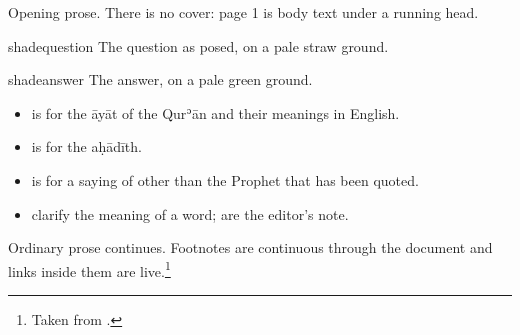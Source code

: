 \documentclass[12pt]{article}
\begin{document}


Opening prose. There is no cover: page 1 is body text under a running
head.

\begin{shaded}{shadequestion}
The question as posed, on a pale straw ground.
\end{shaded}

\begin{shaded}{shadeanswer}
The answer, on a pale green ground.
\end{shaded}


\begin{itemize}
  \item {} is for the āyāt of the Qurʾān and their
        meanings in English.
  \item {} is for the aḥādīth.
  \item {} is for a saying of other than the Prophet
        \saw{} that has been quoted.
  \item {} clarify the meaning of a word;
         are the editor's note.
\end{itemize}

\divider

Ordinary prose continues. Footnotes are continuous through the document
and links inside them are live.\footnote{Taken from
.}
\end{document}
